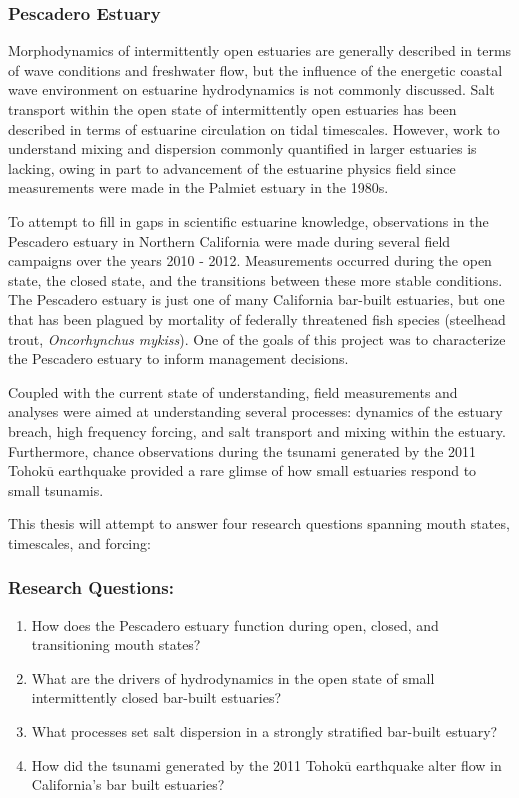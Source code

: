 \subsubsection{Pescadero Estuary} 
Morphodynamics of intermittently open estuaries are generally described in terms of wave conditions and freshwater flow, but the influence of the energetic coastal wave environment on estuarine hydrodynamics is not commonly discussed. Salt transport within the open state of intermittently open estuaries has been described in terms of estuarine circulation on tidal timescales. However, work to understand mixing and dispersion commonly quantified in larger estuaries is lacking, owing in part to advancement of the estuarine physics field since measurements were made in the Palmiet estuary in the 1980s. 


To attempt to fill in gaps in scientific estuarine knowledge, observations in the Pescadero estuary in Northern California were made during several field campaigns over the years 2010 - 2012. Measurements occurred during the open state, the closed state, and the transitions between these more stable conditions. The Pescadero estuary is just one of many California bar-built estuaries, but one that has been plagued by mortality of federally threatened fish species (steelhead trout, \emph{Oncorhynchus mykiss}). One of the goals of this project was to characterize the Pescadero estuary to inform management decisions. 

Coupled with the current state of understanding, field measurements and analyses were aimed at understanding several processes: dynamics of the estuary breach, high frequency forcing, and salt transport and mixing within the estuary. Furthermore, chance observations during the tsunami generated by the 2011 Tohok$\overline{\mathrm{u}}$ earthquake provided a rare glimse of how small estuaries respond to small tsunamis. 

This thesis will attempt to answer four research questions spanning mouth states, timescales, and forcing: 


\subsubsection{Research Questions:}
\begin{enumerate}
	\item{How does the Pescadero estuary function during open, closed, and transitioning mouth states?}
	\item{What are the drivers of hydrodynamics in the open state of small intermittently closed bar-built estuaries?}
	\item{What processes set salt dispersion in a strongly stratified bar-built estuary?}
	\item{How did the tsunami generated by the 2011 Tohok$\overline{\mathrm{u}}$ earthquake alter flow in California's bar built estuaries?}
\end{enumerate}

